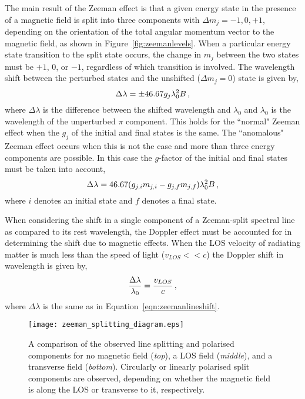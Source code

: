 The main result of the Zeeman effect is that a given energy state in the presence of a magnetic field is split into three components with $\Delta m_j=-1,0,+1$, depending on the orientation of the total angular momentum vector to the magnetic field, as shown in Figure~\ref{fig:zeemanlevels}. When a particular energy state transition to the split state occurs, the change in $m_j$ between the two states must be $+1$, 0, or $-1$, regardless of which transition is involved. The wavelength shift between the perturbed states and the unshifted ($\Delta m_j=0$) state is given by,
\begin{equation}\label{eqn:zeemanlineshift}
\Delta \lambda = \pm 46.67 g_j \lambda_0^2 B \mbox{\,,}
\end{equation}
where $\Delta \lambda$ is the difference between the shifted wavelength and $\lambda_0$ and $\lambda_0$ is the wavelength of the unperturbed $\pi$ component. This holds for the ``normal" Zeeman effect when the $g_j$ of the initial and final states is the same. The ``anomalous" Zeeman effect occurs when this is not the case and more than three energy components are possible. In this case the $g$-factor of the initial and final states must be taken into account, 
\begin{equation}
\Delta \lambda = 46.67 (g_{j,i}m_{j,i} - g_{j,f}m_{j,f}) \lambda_0^2 B \mbox{\,,}
\end{equation}
where $i$ denotes an initial state and $f$ denotes a final state. 

When considering the shift in a single component of a Zeeman-split spectral line as compared to its rest wavelength, the Doppler effect must be accounted for in determining the shift due to magnetic effects. When the \gls{LOS} velocity of radiating matter is much less than the speed of light ($v_{LOS}<<c$) the Doppler shift in wavelength is given by,
\begin{equation}
\frac{\Delta \lambda}{\lambda_0} = \frac{v_{LOS}}{c} \mbox{\,,}
\end{equation}
where $\Delta \lambda$ is the same as in Equation~\ref{eqn:zeemanlineshift}. 

\begin{figure}[!t]
\centerline{\texttt{[image: zeeman\_splitting\_diagram.eps]}}
\caption[A comparison of the line splitting and polarisation do to the Zeeman effect.]{A comparison of the observed line splitting and polarised components for no magnetic field (\emph{top}), a LOS field (\emph{middle}), and a transverse field (\emph{bottom}). Circularly or linearly polarised split components are observed, depending on whether the magnetic field is along the LOS or transverse to it, respectively.}
\label{fig:zeemanpolarisation}
\end{figure}

